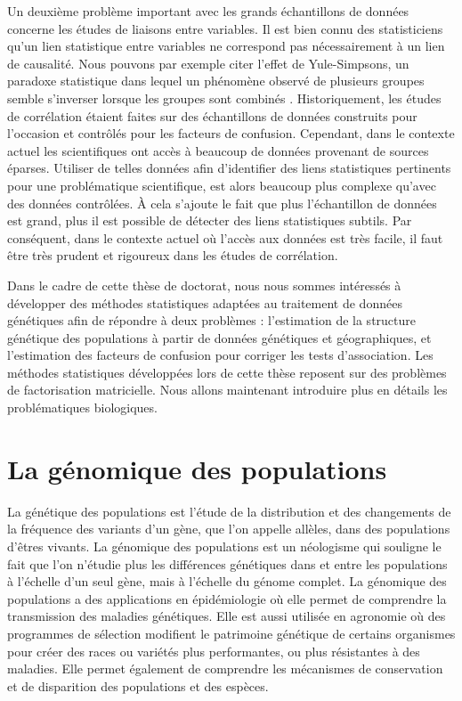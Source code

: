 \documentclass[12pt,a4paper,twoside]{ugathesis}
\begin{document}
Un deuxième problème important avec les grands échantillons de données concerne
les études de liaisons entre variables. Il est bien connu des statisticiens
qu'un lien statistique entre variables ne correspond pas nécessairement à un
lien de causalité. Nous pouvons par exemple citer l'effet de Yule-Simpsons, un
paradoxe statistique dans lequel un phénomène observé de plusieurs groupes
semble s'inverser lorsque les groupes sont combinés
\citep{simpson1951interpretation}. Historiquement, les études de corrélation
étaient faites sur des échantillons de données construits pour l'occasion et
contrôlés pour les facteurs de confusion. Cependant, dans le contexte actuel les
scientifiques ont accès à beaucoup de données provenant de sources éparses.
Utiliser de telles données afin d'identifier des liens statistiques pertinents
pour une problématique scientifique, est alors beaucoup plus complexe qu'avec
des données contrôlées. À cela s'ajoute le fait que plus l'échantillon de
données est grand, plus il est possible de détecter des liens statistiques
subtils. Par conséquent, dans le contexte actuel où l'accès aux données est très
facile, il faut être très prudent et rigoureux dans les études de corrélation.

Dans le cadre de cette thèse de doctorat, nous nous sommes intéressés à
développer des méthodes statistiques adaptées au traitement de données
génétiques afin de répondre à deux problèmes : l'estimation de la structure
génétique des populations à partir de données génétiques et géographiques, et
l'estimation des facteurs de confusion pour corriger les tests d'association.
Les méthodes statistiques développées lors de cette thèse reposent sur des
problèmes de factorisation matricielle. Nous allons maintenant introduire plus
en détails les problématiques biologiques.

\section{La génomique des populations}
\label{sec:org680933b}
\label{orgb08f682}

La génétique des populations est l'étude de la distribution et des changements
de la fréquence des variants d'un gène, que l'on appelle allèles, dans des
populations d'êtres vivants. La génomique des populations est un néologisme qui
souligne le fait que l'on n'étudie plus les différences génétiques dans et entre
les populations à l'échelle d'un seul gène, mais à l'échelle du génome complet.
La génomique des populations a des applications en épidémiologie où elle permet
de comprendre la transmission des maladies génétiques. Elle est aussi utilisée
en agronomie où des programmes de sélection modifient le patrimoine génétique de
certains organismes pour créer des races ou variétés plus performantes, ou plus
résistantes à des maladies. Elle permet également de comprendre les mécanismes
de conservation et de disparition des populations et des espèces.
\end{document}
